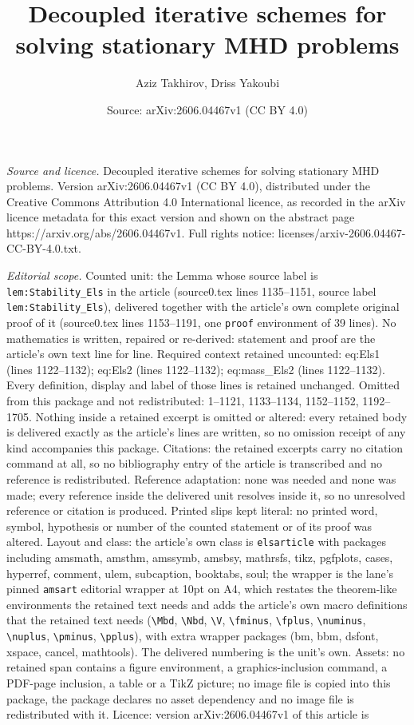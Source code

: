 \documentclass[10pt,a4paper]{amsart}
\title[Decoupled iterative schemes for solving stationary MHD probl]{Decoupled iterative schemes for solving stationary MHD problems}
\author{Aziz Takhirov, Driss Yakoubi}
\date{Source: arXiv:2606.04467v1 (CC BY 4.0)}
\begin{document}
\maketitle

\noindent\emph{Source and licence.} Decoupled iterative schemes for solving stationary MHD problems. Version arXiv:2606.04467v1 (CC BY 4.0), distributed under the Creative Commons Attribution 4.0 International licence, as recorded in the arXiv licence metadata for this exact version and shown on the abstract page https://arxiv.org/abs/2606.04467v1. Full rights notice: licenses/arxiv-2606.04467-CC-BY-4.0.txt.\par\smallskip

\noindent\textit{Editorial scope.} Counted unit: the Lemma whose source label is \texttt{lem:Stability\_Els} in the article (source0.tex lines 1135--1151, source label \texttt{lem:Stability\_Els}), delivered together with the article's own complete original proof of it (source0.tex lines 1153--1191, one \texttt{proof} environment of 39 lines). No mathematics is written, repaired or re-derived: statement and proof are the article's own text line for line. Required context retained uncounted: eq:Els1 (lines 1122--1132); eq:Els2 (lines 1122--1132); eq:mass\_Els2 (lines 1122--1132). Every definition, display and label of those lines is retained unchanged. Omitted from this package and not redistributed: 1--1121, 1133--1134, 1152--1152, 1192--1705. Nothing inside a retained excerpt is omitted or altered: every retained body is delivered exactly as the article's lines are written, so no omission receipt of any kind accompanies this package. Citations: the retained excerpts carry no citation command at all, so no bibliography entry of the article is transcribed and no reference is redistributed. Reference adaptation: none was needed and none was made; every reference inside the delivered unit resolves inside it, so no unresolved reference or citation is produced. Printed slips kept literal: no printed word, symbol, hypothesis or number of the counted statement or of its proof was altered. Layout and class: the article's own class is \texttt{elsarticle} with packages including amsmath, amsthm, amssymb, amsbsy, mathrsfs, tikz, pgfplots, cases, hyperref, comment, ulem, subcaption, booktabs, soul; the wrapper is the lane's pinned \texttt{amsart} editorial wrapper at 10pt on A4, which restates the theorem-like environments the retained text needs and adds the article's own macro definitions that the retained text needs (\texttt{\textbackslash Mbd}, \texttt{\textbackslash Nbd}, \texttt{\textbackslash V}, \texttt{\textbackslash fminus}, \texttt{\textbackslash fplus}, \texttt{\textbackslash numinus}, \texttt{\textbackslash nuplus}, \texttt{\textbackslash pminus}, \texttt{\textbackslash pplus}), with extra wrapper packages (bm, bbm, dsfont, xspace, cancel, mathtools). The delivered numbering is the unit's own. Assets: no retained span contains a figure environment, a graphics-inclusion command, a PDF-page inclusion, a table or a TikZ picture; no image file is copied into this package, the package declares no asset dependency and no image file is redistributed with it. Licence: version arXiv:2606.04467v1 of this article is 
\end{document}
